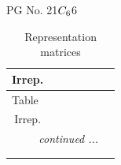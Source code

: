 \documentclass[fleqn,8pt,landscape]{jsarticle}
\begin{document}
\setcounter{MaxMatrixCols}{32}

\renewcommand{\tablename}{Table~}
\renewcommand{\figurename}{Figure~}
\begin{center}
\LARGE
PG No. 21\quad$C_{\rm 6}$\quad$6$\quad[ hexagonal ]
\end{center}
\renewcommand{\arraystretch}{1.2}
\begin{longtable}{ccccccc}
\caption{Representation matrices}
 \\
 \hline \hline
Irrep. &  &  &  &  &  &  \\ \hline \endfirsthead

\multicolumn{6}{l}{\tablename\ \thetable{}} \\
 \hline \hline
Irrep. &  &  &  &  &  &  \\ \hline \endhead

 \hline \hline
\multicolumn{6}{r}{\footnotesize\it continued ...} \\ \endfoot

 \hline \hline
\multicolumn{6}{r}{} \\ \endlastfoot


\end{longtable}
\end{document}
